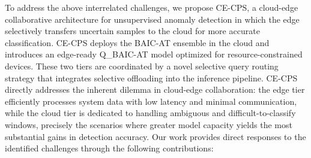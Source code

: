 \documentclass[pdflatex,sn-mathphys-num]{sn-jnl}%
\theoremstyle{thmstyleone}
\theoremstyle{thmstyletwo}%
\theoremstyle{thmstylethree}%
\begin{document}
To address the above interrelated challenges, we propose CE-CPS, a cloud-edge collaborative architecture for unsupervised anomaly detection in which the edge selectively transfers uncertain samples to the cloud for more accurate classification.
CE-CPS deploys the BAIC-AT ensemble in the cloud and introduces an edge-ready Q\_BAIC-AT model optimized for resource-constrained devices. These two tiers are coordinated by a novel selective query routing strategy that integrates selective offloading into the inference pipeline.
CE-CPS directly addresses the inherent dilemma in cloud-edge collaboration: the edge tier efficiently processes system data with low latency and minimal communication, while the cloud tier is dedicated to handling ambiguous and difficult-to-classify windows, precisely the scenarios where greater model capacity yields the most substantial gains in detection accuracy.
Our work provides direct responses to the identified challenges through the following contributions:
\end{document}
